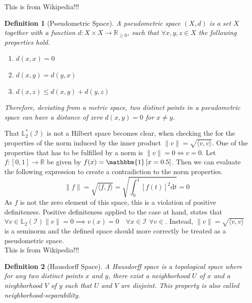 \documentclass[12pt, a4paper]{article}
\theoremstyle{MAstyle} \newtheorem{assumption}{Assumption}[section]
\theoremstyle{MAstyle} \newtheorem{definition}{Definition}[section]
\begin{document}
			{\color{red} This is from Wikipedia!!!}
			\begin{definition}[Pseudometric Space]
				A pseudometric space $\left(X, d\right)$ is a set $X$ together with a function $d:X\times X \rightarrow \mathbb{R}_{\geq 0}$, such that $\forall x,y,z \in X$ the following properties hold.
				\begin{multicols}{2}
					\begin{enumerate}
						\item $d(x,x) = 0$
						\item $d(x,y) = d(y,x)$
						\item $d(x,z) \leq d(x,y) + d(y,z)$
					\end{enumerate}
				\end{multicols}
				Therefore, deviating from a metric space, two distinct points in a pseudometric space can have a distance of zero $d(x,y) = 0$ for $x \neq y$.
			\end{definition}
			
			That $\mathbb{L}^{*}_2(\mathcal{I})$ is not a Hilbert space becomes clear, when checking the for the properties of the norm induced by the inner product $\| v \| = \sqrt{\langle v, v\rangle}$.
			One of the properties that has to be fulfilled by a norm is $\| v \| = 0 \Longleftrightarrow v = 0$.			
			Let $f:[0,1] \rightarrow \mathbb{R}$ be given by $f(x) = \mathbbm{1}\left[x = 0.5\right]$. Then we can evaluate the following expression to create a contradiction to the norm properties.
			\begin{equation}
				\| f \| = \sqrt{\langle f, f\rangle} = \sqrt{\int_{0}^{1} \left[f(t)\right]^2\mathrm{d}t } = 0
			\end{equation}
			As $f$ is not the zero element of this space, this is a violation of positive definiteness. Positive definiteness applied to the case at hand, states that $\forall v \in \mathbb{L}_2\left(\mathcal{I}\right) \| v \| = 0 \implies v(x) = 0 \quad \forall x \in \mathcal{I}$  $\forall v \in $. Instead, $\| v \| = \sqrt{\langle v, v\rangle}$ is a seminorm and the defined space should more correctly be treated as a pseudometric space.\\
			
			{\color{red} This is from Wikipedia!!!}
			\begin{definition}[Hausdorff Space]
				A Hausdorff space is a topological space where for any two distinct points $x$ and $y$, there exist a neighborhood $U$ of $x$ and a nieghborhood $V$ of $y$ such that $U$ and $V$ are disjoint. This property is also called neighborhood-separability.
			\end{definition}
			
\end{document}
